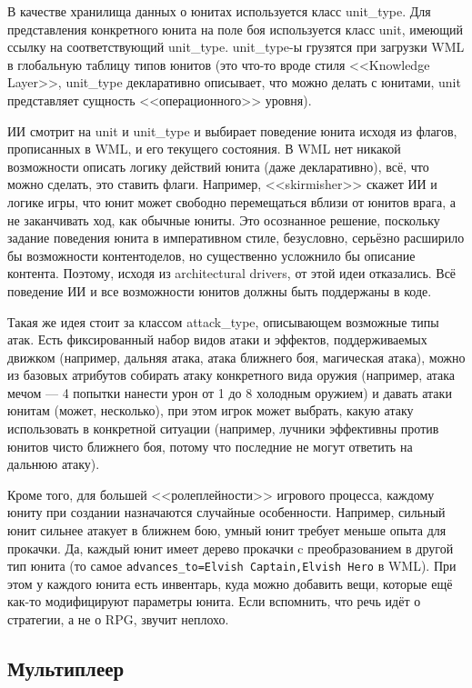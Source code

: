 \documentclass{../text-style}
\begin{document}
В качестве хранилища данных о юнитах используется класс unit\_type. Для представления конкретного юнита на поле боя используется класс unit, имеющий ссылку на соответствующий unit\_type. unit\_type-ы грузятся при загрузки WML в глобальную таблицу типов юнитов (это что-то вроде стиля <<Knowledge Layer>>, unit\_type декларативно описывает, что можно делать с юнитами, unit представляет сущность <<операционного>> уровня). 

ИИ смотрит на unit и unit\_type и выбирает поведение юнита исходя из флагов, прописанных в WML, и его текущего состояния. В WML нет никакой возможности описать логику действий юнита (даже декларативно), всё, что можно сделать, это ставить флаги. Например, <<skirmisher>> скажет ИИ и логике игры, что юнит может свободно перемещаться вблизи от юнитов врага, а не заканчивать ход, как обычные юниты. Это осознанное решение, поскольку задание поведения юнита в императивном стиле, безусловно, серьёзно расширило бы возможности контентоделов, но существенно усложнило бы описание контента. Поэтому, исходя из architectural drivers, от этой идеи отказались. Всё поведение ИИ и все возможности юнитов должны быть поддержаны в коде.

Такая же идея стоит за классом attack\_type, описывающем возможные типы атак. Есть фиксированный набор видов атаки и эффектов, поддерживаемых движком (например, дальняя атака, атака ближнего боя, магическая атака), можно из базовых атрибутов собирать атаку конкретного вида оружия (например, атака мечом --- 4 попытки нанести урон от 1 до 8 холодным оружием) и давать атаки юнитам (может, несколько), при этом игрок может выбрать, какую атаку использовать в конкретной ситуации (например, лучники эффективны против юнитов чисто ближнего боя, потому что последние не могут ответить на дальнюю атаку).

Кроме того, для большей <<ролеплейности>> игрового процесса, каждому юниту при создании назначаются случайные особенности. Например, сильный юнит сильнее атакует в ближнем бою, умный юнит требует меньше опыта для прокачки. Да, каждый юнит имеет дерево прокачки c преобразованием в другой тип юнита (то самое \texttt{advances_to=Elvish Captain,Elvish Hero} в WML). При этом у каждого юнита есть инвентарь, куда можно добавить вещи, которые ещё как-то модифицируют параметры юнита. Если вспомнить, что речь идёт о стратегии, а не о RPG, звучит неплохо.

\subsection{Мультиплеер}
\end{document}
